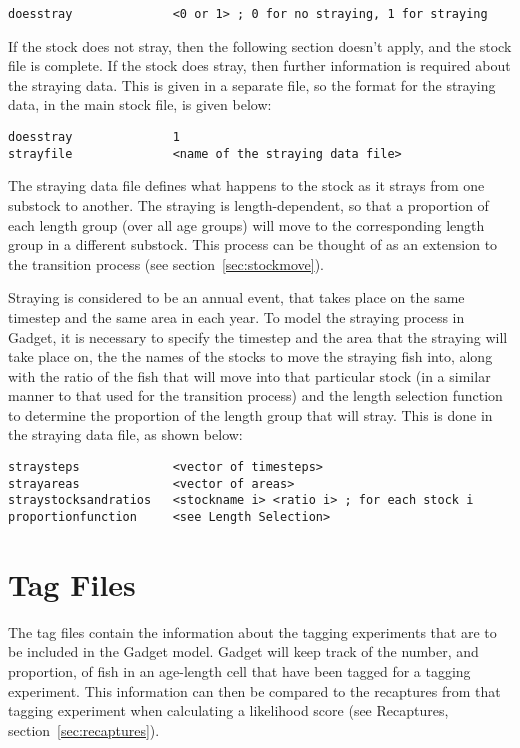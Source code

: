 \documentclass[10pt,twoside]{book}
\begin{document}
{\small\begin{verbatim}
doesstray              <0 or 1> ; 0 for no straying, 1 for straying
\end{verbatim}}

If the stock does not stray, then the following section doesn't apply, and the stock file is complete.  If the stock does stray, then further information is required about the straying data.  This is given in a separate file, so the format for the straying data, in the main stock file, is given below:

{\small\begin{verbatim}
doesstray              1
strayfile              <name of the straying data file>
\end{verbatim}}

The straying data file defines what happens to the stock as it strays from one substock to another.  The straying is length-dependent, so that a proportion of each length group (over all age groups) will move to the corresponding length group in a different substock.  This process can be thought of as an extension to the transition process (see section~\ref{sec:stockmove}).

\bigskip
Straying is considered to be an annual event, that takes place on the same timestep and the same area in each year.  To model the straying process in Gadget, it is necessary to specify the timestep and the area that the straying will take place on, the the names of the stocks to move the straying fish into, along with the ratio of the fish that will move into that particular stock (in a similar manner to that used for the transition process) and the length selection function to determine the proportion of the length group that will stray.  This is done in the straying data file, as shown below:

{\small\begin{verbatim}
straysteps             <vector of timesteps>
strayareas             <vector of areas>
straystocksandratios   <stockname i> <ratio i> ; for each stock i
proportionfunction     <see Length Selection>
\end{verbatim}}

\chapter{Tag Files}\label{chap:tag}
The tag files contain the information about the tagging experiments that are to be included in the Gadget model.  Gadget will keep track of the number, and proportion, of fish in an age-length cell that have been tagged for a tagging experiment.  This information can then be compared to the recaptures from that tagging experiment when calculating a likelihood score (see Recaptures, section~\ref{sec:recaptures}).
\end{document}
